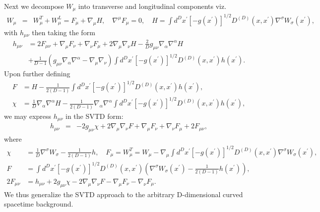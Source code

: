 \documentclass[aps,onecolumn,10pt]{revtex4}
\numberwithin{equation}{section}
\numberwithin{equation}{section}
\begin{document}
Next we decompose $W_{\mu}$ into transverse and longitudinal components viz.
%
\begin{eqnarray}
W_{\mu} &=&W^T_{\mu}+W^L_{\mu}=F_{\mu}+\nabla_{\mu}H,\quad  \nabla^{\mu}F_{\mu}=0,\quad H=\int d^Dx^{\prime}[-g(x^{\prime})]^{1/2}D^{(D)}(x,x^{\prime})\nabla^\sigma W_\sigma(x^{\prime}),
\label{A.45a}
\end{eqnarray}
%
with $h_{\mu\nu}$ then taking the form
%
\begin{align}
h_{\mu\nu}&= 2F_{\mu\nu} + \nabla_\mu F_\nu + \nabla_\nu F_\mu + 2 \nabla_\mu\nabla_\nu H - \frac{2}{D}g_{\mu\nu}\nabla_\alpha \nabla^\alpha H 
\nonumber\\
&+\frac{1}{D-1}\left( g_{\mu\nu}\nabla_\alpha \nabla^\alpha - \nabla_\mu\nabla_\nu\right)\int d^Dx^{\prime}[-g(x^{\prime})]^{1/2} D^{(D)}(x,x^{\prime}) h(x^{\prime}).
\label{A.46a}
\end{align}
%
Upon further defining
%
\begin{align}
F &= H - \frac{1}{2(D-1)} \int d^Dx^{\prime}[-g(x^{\prime})]^{1/2} D^{(D)}(x,x^{\prime}) h(x^{\prime}),
\nonumber\\
\chi &= \frac{1}{D}\nabla_\alpha\nabla^\alpha H - \frac{1}{2(D-1)}\nabla_\alpha\nabla^\alpha\int d^Dx^{\prime}[-g(x^{\prime})]^{1/2} D^{(D)}(x,x^{\prime}) h(x^{\prime}),
\label{A.47a}
\end{align}
%
we may express $h_{\mu\nu}$ in the SVTD form:
%
\begin{eqnarray}
h_{\mu\nu} &=& -2g_{\mu\nu}\chi + 2\nabla_\mu\nabla_\nu F + \nabla_\mu F_\nu + \nabla_\nu F_\mu + 2F_{\mu\nu}
\label{A.48a},
\end{eqnarray}
%
where
%
\begin{align}
\chi &= \frac{1}{D}\nabla^\sigma W_{\sigma}  - \frac{1}{2(D-1)}h,\quad F_{\mu} = W_{\mu}^T=W_{\mu} -\nabla_\mu \int d^Dx^{\prime}[-g(x^{\prime})]^{1/2} D^{(D)}(x,x^{\prime})\nabla^{\sigma}W_\sigma(x^{\prime}),
\nonumber\\
F &= \int d^Dx^{\prime}[-g(x^{\prime})]^{1/2} D^{(D)}(x,x^{\prime}) \left(\nabla^\sigma W_{\sigma}(x^{\prime})  - \frac{1}{2(D-1)}h(x^{\prime})\right),
\nonumber\\
2F_{\mu\nu} &= h_{\mu\nu}+2g_{\mu\nu}\chi - 2\nabla_\mu\nabla_\nu F - \nabla_\mu F_\nu - \nabla_\nu F_{\mu}.
\label{A.49a}
\end{align}
%
We thus generalize the SVTD approach to the arbitrary D-dimensional curved spacetime background.
\end{document}

